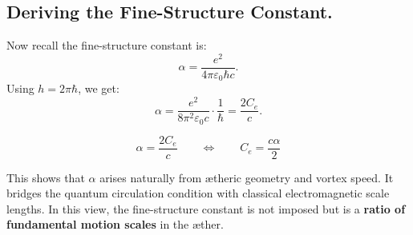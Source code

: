 \subsection*{Deriving the Fine-Structure Constant.}
Now recall the fine-structure constant is:
\begin{equation*}
    \alpha = \frac{e^2}{4 \pi \varepsilon_0 \hbar c}.
\end{equation*}
Using \( h = 2\pi \hbar \), we get:
\begin{equation*}
    \alpha = \frac{e^2}{8 \pi^2 \varepsilon_0 c} \cdot \frac{1}{\hbar} = \frac{2 C_e}{c}.
\end{equation*}

\begin{equation}
    \boxed{
        \alpha = \frac{2 C_e}{c}
    }
    \qquad \Leftrightarrow \qquad
    \boxed{
        C_e = \frac{c \alpha}{2}
    }
\end{equation}

This shows that \( \alpha \) arises naturally from ætheric geometry and vortex speed. It bridges the quantum circulation condition with classical electromagnetic scale lengths. In this view, the fine-structure constant is not imposed but is a \textbf{ratio of fundamental motion scales} in the æther.

